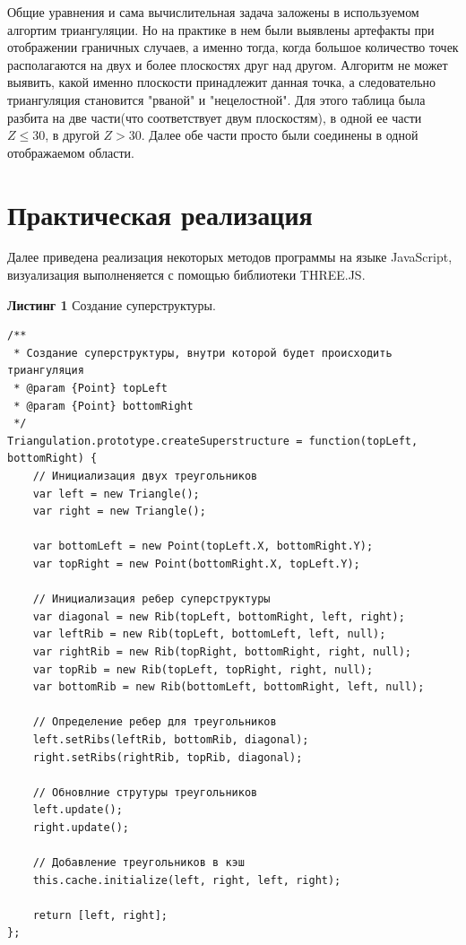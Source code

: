 \documentclass[a4paper, 12pt]{article}   	%
\begin{document}
    Общие уравнения и сама вычислительная задача заложены в используемом алгортим триангуляции. Но на практике в нем были выявлены артефакты при отображении граничных случаев, а именно тогда, когда большое количество точек располагаются на двух и более плоскостях друг над другом. Алгоритм не может выявить, какой именно плоскости принадлежит данная точка, а следовательно триангуляция становится "рваной" и "нецелостной". Для этого таблица была разбита на две части(что соответствует двум плоскостям), в одной ее части $Z \leq 30$, в другой $Z > 30$. Далее обе части просто были соединены в одной отображаемом области.

    
\newpage

\section{Практическая реализация}
    Далее приведена реализация некоторых методов программы на языке JavaScript, визуализация выполненяется с помощью библиотеки THREE.JS.

\textbf{Листинг 1} Создание суперструктуры.
\begin{verbatim}
/**
 * Создание суперструктуры, внутри которой будет происходить триангуляция
 * @param {Point} topLeft
 * @param {Point} bottomRight
 */
Triangulation.prototype.createSuperstructure = function(topLeft, bottomRight) {
    // Инициализация двух треугольников
    var left = new Triangle();
    var right = new Triangle();

    var bottomLeft = new Point(topLeft.X, bottomRight.Y);
    var topRight = new Point(bottomRight.X, topLeft.Y);

    // Инициализация ребер суперструктуры
    var diagonal = new Rib(topLeft, bottomRight, left, right);
    var leftRib = new Rib(topLeft, bottomLeft, left, null);
    var rightRib = new Rib(topRight, bottomRight, right, null);
    var topRib = new Rib(topLeft, topRight, right, null);
    var bottomRib = new Rib(bottomLeft, bottomRight, left, null);

    // Определение ребер для треугольников
    left.setRibs(leftRib, bottomRib, diagonal);
    right.setRibs(rightRib, topRib, diagonal);

    // Обновлние струтуры треугольников
    left.update();
    right.update();

    // Добавление треугольников в кэш
    this.cache.initialize(left, right, left, right);

    return [left, right];
};
\end{verbatim}
\end{document}
